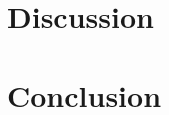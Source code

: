 \documentclass[conference]{IEEEtran}
\begin{document}
\section{Discussion}
{
    \bigbreak
    \begin{spacing}{1.1}
        \fontsize{10pt}{10pt}\selectfont\setlength{\parindent}{5mm}\justifying
        
    \end{spacing}
}

\section{Conclusion}
{
    \bigbreak
    \begin{spacing}{1.1}
        \fontsize{10pt}{10pt}\selectfont\setlength{\parindent}{5mm}\justifying
        
    \end{spacing}
}




% 
\end{document}
